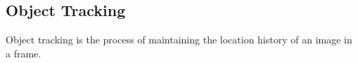 \subsection{Object Tracking}

Object tracking is the process of maintaining the location history of an image in a frame. 